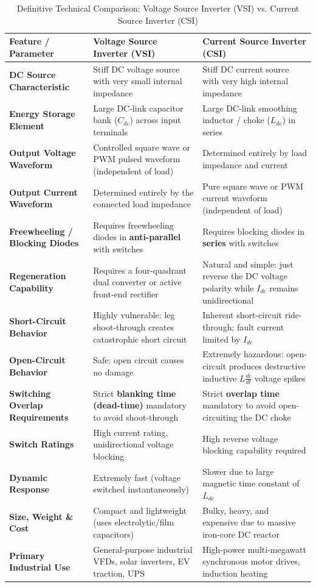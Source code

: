 \documentclass[11pt,a4paper]{article}
\begin{document}
\begin{table}[htbp]
\centering
\small
\caption{Definitive Technical Comparison: Voltage Source Inverter (VSI) vs. Current Source Inverter (CSI)}
\label{tab:vsi_vs_csi}
\begin{tabularx}{\textwidth}{l p{6.5cm} X}
\toprule
\textbf{Feature / Parameter} & \textbf{Voltage Source Inverter (VSI)} & \textbf{Current Source Inverter (CSI)} \\
\midrule
\textbf{DC Source Characteristic} & Stiff DC voltage source with very small internal impedance & Stiff DC current source with very high internal impedance \\
\textbf{Energy Storage Element} & Large DC-link capacitor bank ($C_{dc}$) across input terminals & Large DC-link smoothing inductor / choke ($L_{dc}$) in series \\
\textbf{Output Voltage Waveform} & Controlled square wave or PWM pulsed waveform (independent of load) & Determined entirely by load impedance and current \\
\textbf{Output Current Waveform} & Determined entirely by the connected load impedance & Pure square wave or PWM current waveform (independent of load) \\
\textbf{Freewheeling / Blocking Diodes} & Requires freewheeling diodes in \textbf{anti-parallel} with switches & Requires blocking diodes in \textbf{series} with switches \\
\textbf{Regeneration Capability} & Requires a four-quadrant dual converter or active front-end rectifier & Natural and simple: just reverse the DC voltage polarity while $I_{dc}$ remains unidirectional \\
\textbf{Short-Circuit Behavior} & Highly vulnerable: leg shoot-through creates catastrophic short circuit & Inherent short-circuit ride-through; fault current limited by $I_{dc}$ \\
\textbf{Open-Circuit Behavior} & Safe: open circuit causes no damage & Extremely hazardous: open-circuit produces destructive inductive $L \frac{di}{dt}$ voltage spikes \\
\textbf{Switching Overlap Requirements} & Strict \textbf{blanking time (dead-time)} mandatory to avoid shoot-through & Strict \textbf{overlap time} mandatory to avoid open-circuiting the DC choke \\
\textbf{Switch Ratings} & High current rating, unidirectional voltage blocking & High reverse voltage blocking capability required \\
\textbf{Dynamic Response} & Extremely fast (voltage switched instantaneously) & Slower due to large magnetic time constant of $L_{dc}$ \\
\textbf{Size, Weight \& Cost} & Compact and lightweight (uses electrolytic/film capacitors) & Bulky, heavy, and expensive due to massive iron-core DC reactor \\
\textbf{Primary Industrial Use} & General-purpose industrial VFDs, solar inverters, EV traction, UPS & High-power multi-megawatt synchronous motor drives, induction heating \\
\bottomrule
\end{tabularx}
\end{table}
\end{document}
